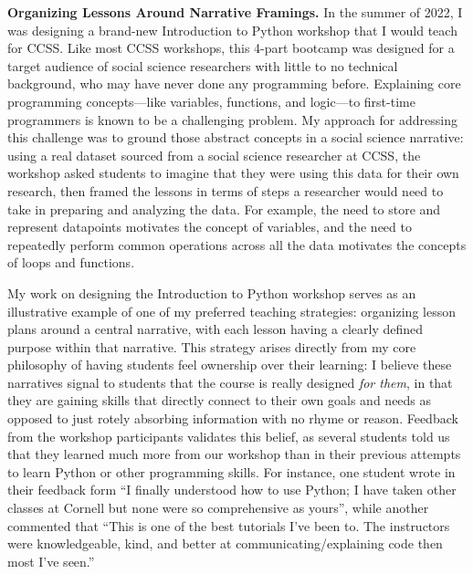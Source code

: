 \documentclass[11pt,letterpaper]{article}
\renewcommand{\section}[1]{\vspace{0.25\baselineskip}\noindent\textbf{#1.}}
\begin{document}
\section{Organizing Lessons Around Narrative Framings}
In the summer of 2022, I was designing a brand-new Introduction to Python workshop that I would teach for CCSS.
Like most CCSS workshops, this 4-part bootcamp was designed for a target audience of social science researchers with little to no technical background, who may have never done any programming before.
Explaining core programming concepts---like variables, functions, and logic---to first-time programmers is known to be a challenging problem.
My approach for addressing this challenge was to ground those abstract concepts in a social science narrative: using a real dataset sourced from a social science researcher at CCSS, the workshop asked students to imagine that they were using this data for their own research, then framed the lessons in terms of steps a researcher would need to take in preparing and analyzing the data.
For example, the need to store and represent datapoints motivates the concept of variables, and the need to repeatedly perform common operations across all the data motivates the concepts of loops and functions.

My work on designing the Introduction to Python workshop serves as an illustrative example of one of my preferred teaching strategies: organizing lesson plans around a central narrative, with each lesson having a clearly defined purpose within that narrative.
This strategy arises directly from my core philosophy of having students feel ownership over their learning: I believe these narratives signal to students that the course is really designed \emph{for them}, in that they are gaining skills that directly connect to their own goals and needs as opposed to just rotely absorbing information with no rhyme or reason.
Feedback from the workshop participants validates this belief, as several students told us that they learned much more from our workshop than in their previous attempts to learn Python or other programming skills.
For instance, one student wrote in their feedback form ``I finally understood how to use Python; I have taken other classes at Cornell but none were so comprehensive as yours'', while another commented that ``This is one of the best tutorials I've been to. The instructors were knowledgeable, kind, and better at communicating/explaining code then most I've seen.''
\end{document}
